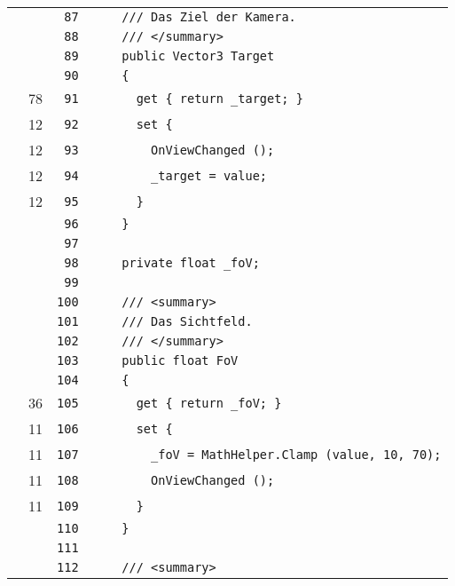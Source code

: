 \documentclass[a4paper,10pt]{article}
\begin{document}
\begin{longtable}[l]{lrrl}
\cellcolor{gray} &  & \verb~87~ & \verb~    /// Das Ziel der Kamera.~\\
\cellcolor{gray} &  & \verb~88~ & \verb~    /// </summary>~\\
\cellcolor{gray} &  & \verb~89~ & \verb~    public Vector3 Target~\\
\cellcolor{gray} &  & \verb~90~ & \verb~    {~\\
\cellcolor{green} & 78 & \verb~91~ & \verb~      get { return _target; }~\\
\cellcolor{green} & 12 & \verb~92~ & \verb~      set {~\\
\cellcolor{green} & 12 & \verb~93~ & \verb~        OnViewChanged ();~\\
\cellcolor{green} & 12 & \verb~94~ & \verb~        _target = value;~\\
\cellcolor{green} & 12 & \verb~95~ & \verb~      }~\\
\cellcolor{gray} &  & \verb~96~ & \verb~    }~\\
\cellcolor{gray} &  & \verb~97~ & \verb~~\\
\cellcolor{gray} &  & \verb~98~ & \verb~    private float _foV;~\\
\cellcolor{gray} &  & \verb~99~ & \verb~~\\
\cellcolor{gray} &  & \verb~100~ & \verb~    /// <summary>~\\
\cellcolor{gray} &  & \verb~101~ & \verb~    /// Das Sichtfeld.~\\
\cellcolor{gray} &  & \verb~102~ & \verb~    /// </summary>~\\
\cellcolor{gray} &  & \verb~103~ & \verb~    public float FoV~\\
\cellcolor{gray} &  & \verb~104~ & \verb~    {~\\
\cellcolor{green} & 36 & \verb~105~ & \verb~      get { return _foV; }~\\
\cellcolor{green} & 11 & \verb~106~ & \verb~      set {~\\
\cellcolor{green} & 11 & \verb~107~ & \verb~        _foV = MathHelper.Clamp (value, 10, 70);~\\
\cellcolor{green} & 11 & \verb~108~ & \verb~        OnViewChanged ();~\\
\cellcolor{green} & 11 & \verb~109~ & \verb~      }~\\
\cellcolor{gray} &  & \verb~110~ & \verb~    }~\\
\cellcolor{gray} &  & \verb~111~ & \verb~~\\
\cellcolor{gray} &  & \verb~112~ & \verb~    /// <summary>~\\

\end{longtable}
\end{document}
